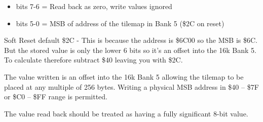 \begin{itemize}
\item bits 7-6 = Read back as zero, write values ignored
\item bits 5-0 = MSB of address of the tilemap in Bank 5 (\$2C on
  reset)
\end{itemize}
Soft Reset default \$2C - This is because the address is \$6C00 so the
MSB is \$6C. But the stored value is only the lower 6 bits so it's an
offset into the 16k Bank 5. To calculate therefore subtract \$40
leaving you with \$2C.

The value written is an offset into the 16k Bank 5 allowing the
tilemap to be placed at any multiple of 256 bytes.  Writing a physical
MSB address in \$40 -- \$7F or \$C0 -- \$FF range is permitted.

The value read back should be treated as having a fully significant
8-bit value.

